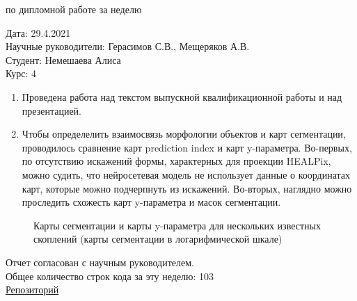 \documentclass{article}
\begin{document}
\begin{center}{ по дипломной работе за неделю\\}\end{center}
Дата: 29.4.2021\\
Научные руководители: Герасимов С.В., Мещеряков А.В.\\
Студент: Немешаева Алиса\\
Курс: 4\\

\renewcommand{\labelitemi}{$\blacksquare$}
\renewcommand\labelitemii{$\square$}

\begin{enumerate}
    \item Проведена работа над текстом выпускной квалификационной работы и над презентацией.\\
    \item Чтобы определелить взаимосвязь морфологии объектов и карт сегментации, проводилось сравнение карт prediction index и карт y-параметра. Во-первых, по отсутствию искажений формы, характерных для проекции HEALPix, можно судить, что нейросетевая модель не использует данные о координатах карт, которые можно подчерпнуть из искажений. Во-вторых, наглядно можно проследить схожесть карт y-параметра и масок сегментации.\\
\end{enumerate}

\begin{figure}[h]
    \caption{Карты сегментации и карты y-параметра для нескольких известных скоплений (карты сегментации в логарифмической шкале)}
\end{figure}

Отчет согласован с научным руководителем.\\
Общее количество строк кода за эту неделю: 103\\
\href{https://github.com/rt2122/data-segmentation-2}{Репозиторий}\\ 
\end{document}
